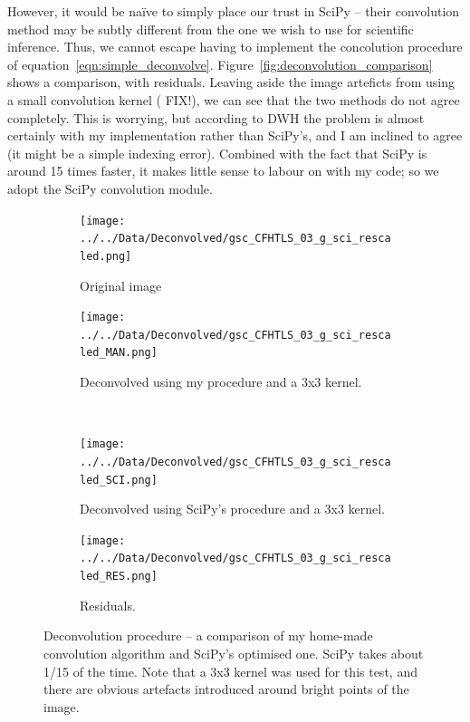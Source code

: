 \documentclass[letterpaper, 11pt]{article}
\def\MORE{{\color{red}{\bf MORE}}\xspace}
\begin{document}
However, it would be na\"ive to simply place our trust in SciPy -- their convolution method may be subtly different from the one we wish to use for scientific inference. Thus, we cannot escape having to implement the concolution procedure of equation~\ref{eqn:simple_deconvolve}. Figure~\vref{fig:deconvolution_comparison} shows a comparison, with residuals. Leaving aside the image arteficts from using a small convolution kernel (\MORE FIX!), we can see that the two methods do not agree completely. This is worrying, but according to DWH the problem is almost certainly with my implementation rather than SciPy's, and I am inclined to agree (it might be a simple indexing error). Combined with the fact that SciPy is around 15 times faster, it makes little sense to labour on with my code; so we adopt the SciPy convolution module.

\begin{figure}
	\def\width{0.3\textwidth}
	\centering
	\begin{subfigure}{\width}
		\texttt{[image: ../../Data/Deconvolved/gsc\_CFHTLS\_03\_g\_sci\_rescaled.png]}
		\caption{Original image}
	\end{subfigure}
	
	\begin{subfigure}{\width}
		\texttt{[image: ../../Data/Deconvolved/gsc\_CFHTLS\_03\_g\_sci\_rescaled\_MAN.png]}
		\caption{Deconvolved using my procedure and a 3x3 kernel.}
	\end{subfigure}
	~
	\begin{subfigure}{\width}
		\texttt{[image: ../../Data/Deconvolved/gsc\_CFHTLS\_03\_g\_sci\_rescaled\_SCI.png]}
		\caption{Deconvolved using SciPy's procedure and a 3x3 kernel.}
	\end{subfigure}
	
	\begin{subfigure}{\width}
		\texttt{[image: ../../Data/Deconvolved/gsc\_CFHTLS\_03\_g\_sci\_rescaled\_RES.png]}
		\caption{Residuals.}
	\end{subfigure}
	\caption{Deconvolution procedure -- a comparison of my home-made convolution algorithm and SciPy's optimised one. SciPy takes about 1/15 of the time. Note that a 3x3 kernel was used for this test, and there are obvious artefacts introduced around bright points of the image.}
	\label{fig:deconvolution_comparison}
\end{figure}


\newpage
{}


\end{document}
